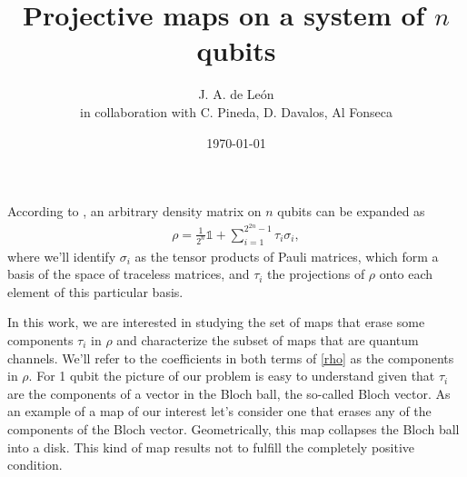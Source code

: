 \documentclass[11pt,dvipsnames]{article} %
\begin{document}
\title{Projective maps on a system of $n$ qubits} 
\author{J. A. de León\\ \small{in collaboration with C. Pineda, D. Davalos, Al Fonseca}}


\date{\today}  

\maketitle
According to \cite{bengtsson_zyczkowski_2017}, an arbitrary density matrix on $n$  
qubits can be expanded as
\begin{align}
  \rho = \frac{1}{2^n}\mathbb{1} + \sum _{i=1}^{2^{2n}-1}\tau _i\sigma _i,
	\label{rho}
\end{align}
where we'll identify $\sigma _i$ as the tensor products of Pauli 
matrices, which form a basis of the space of traceless %
matrices, and 
$\tau_i$ the projections of $\rho$ onto each element of this particular
basis.



In this work, we are interested in studying the set of maps that erase
some components $\tau_i$ in $\rho$ and characterize the subset of maps
that are quantum channels. We'll refer to the coefficients in both terms of 
\eqref{rho} as the components in $\rho$. 
For 1 qubit the picture of our problem is easy to understand given that 
$\tau_i$ are the components of a vector in the Bloch ball, the so-called
Bloch vector. As an example
of a map of our interest let's consider one that erases any of the 
components of the Bloch vector. Geometrically, this map collapses 
the Bloch ball into a disk. This kind of map results not to fulfill 
the completely positive condition.   

\end{document}
